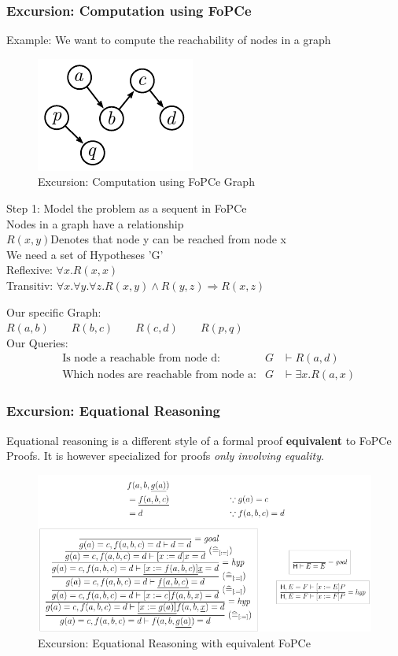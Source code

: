\subsubsection{Excursion: Computation using FoPCe}
Example: We want to compute the reachability of nodes in a graph

\begin{figure}[H]
\centering
\includegraphics[width=0.2\linewidth]{images/fopce_graph_excursion}
\caption{Excursion: Computation using FoPCe Graph}
\label{fig:fopcegraphexcursion}
\end{figure}

Step 1: Model the problem as a sequent in FoPCe \\

Nodes in a graph have a relationship \\
$R(x,y)$\qquad Denotes that node y can be reached from node x\\

We need a set of Hypotheses 'G' \\
Reflexive: $\forall x. R(x,x)$ \\
Transitiv: $\forall x.\forall y.\forall z. R(x,y) \land R(y,z) \Rightarrow R(x,z)$

Our specific Graph:\\
$R(a,b) \qquad R(b,c) \qquad R(c,d) \qquad R(p,q)$\\

Our Queries: \\
\begin{align*}
	&\text{Is node a reachable from node d:} &G &\vdash R(a,d)\\
	&\text{Which nodes are reachable from node a:} &G &\vdash \exists x.R(a,x)
\end{align*}

\subsubsection{Excursion: Equational Reasoning}
Equational reasoning is a different style of a formal proof \textbf{equivalent} to FoPCe Proofs. It is however specialized for proofs \emph{only involving equality}.

\begin{figure}[H]
\centering
\includegraphics[width=0.8\linewidth]{images/fopce_equational_reasoning}
\caption{Excursion: Equational Reasoning with equivalent FoPCe}
\label{fig:fopceequationalreasoning}
\end{figure}

